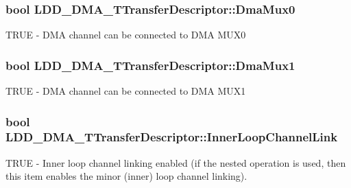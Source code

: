 \subsubsection[{Dma\+Mux0}]{\setlength{\rightskip}{0pt plus 5cm}bool L\+D\+D\+\_\+\+D\+M\+A\+\_\+\+T\+Transfer\+Descriptor\+::\+Dma\+Mux0}\label{struct_l_d_d___d_m_a___t_transfer_descriptor_a2f0b8713587bb922b1f8743a52473ff6}
T\+R\+U\+E -\/ D\+M\+A channel can be connected to D\+M\+A M\+U\+X0 \hypertarget{struct_l_d_d___d_m_a___t_transfer_descriptor_a3bddfb1f8217b18925521909612307db}{}
\subsubsection[{Dma\+Mux1}]{\setlength{\rightskip}{0pt plus 5cm}bool L\+D\+D\+\_\+\+D\+M\+A\+\_\+\+T\+Transfer\+Descriptor\+::\+Dma\+Mux1}\label{struct_l_d_d___d_m_a___t_transfer_descriptor_a3bddfb1f8217b18925521909612307db}
T\+R\+U\+E -\/ D\+M\+A channel can be connected to D\+M\+A M\+U\+X1 \hypertarget{struct_l_d_d___d_m_a___t_transfer_descriptor_a3df48f5bf31d359f8d9d28f8841e9b09}{}
\subsubsection[{Inner\+Loop\+Channel\+Link}]{\setlength{\rightskip}{0pt plus 5cm}bool L\+D\+D\+\_\+\+D\+M\+A\+\_\+\+T\+Transfer\+Descriptor\+::\+Inner\+Loop\+Channel\+Link}\label{struct_l_d_d___d_m_a___t_transfer_descriptor_a3df48f5bf31d359f8d9d28f8841e9b09}
T\+R\+U\+E -\/ Inner loop channel linking enabled (if the nested operation is used, then this item enables the minor (inner) loop channel linking). \hypertarget{struct_l_d_d___d_m_a___t_transfer_descriptor_a78eb4ce6c6e05add15799c5389637ce3}{}
